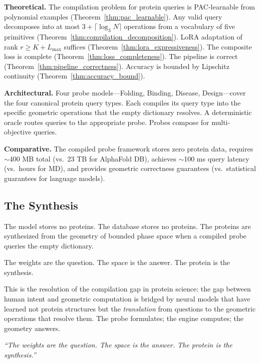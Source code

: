 \documentclass[11pt,twocolumn,a4paper]{article}
\theoremstyle{definition}
\theoremstyle{remark}
\begin{document}
\textbf{Theoretical.} The compilation problem for protein queries is PAC-learnable from polynomial examples (Theorem~\ref{thm:pac_learnable}). Any valid query decomposes into at most $3 + \lceil \log_3 N \rceil$ operations from a vocabulary of five primitives (Theorem~\ref{thm:compilation_decomposition}). LoRA adaptation of rank $r \geq K + L_{\max}$ suffices (Theorem~\ref{thm:lora_expressiveness}). The composite loss is complete (Theorem~\ref{thm:loss_completeness}). The pipeline is correct (Theorem~\ref{thm:pipeline_correctness}). Accuracy is bounded by Lipschitz continuity (Theorem~\ref{thm:accuracy_bound}).

\textbf{Architectural.} Four probe models---Folding, Binding, Disease, Design---cover the four canonical protein query types. Each compiles its query type into the specific geometric operations that the empty dictionary resolves. A deterministic oracle routes queries to the appropriate probe. Probes compose for multi-objective queries.

\textbf{Comparative.} The compiled probe framework stores zero protein data, requires $\sim$400 MB total (vs.\ 23 TB for AlphaFold DB), achieves $\sim$100 ms query latency (vs.\ hours for MD), and provides geometric correctness guarantees (vs.\ statistical guarantees for language models).

\subsection{The Synthesis}

The model stores no proteins. The database stores no proteins. The proteins are synthesized from the geometry of bounded phase space when a compiled probe queries the empty dictionary.

The weights are the question. The space is the answer. The protein is the synthesis.

This is the resolution of the compilation gap in protein science: the gap between human intent and geometric computation is bridged by neural models that have learned not protein structures but the \emph{translation} from questions to the geometric operations that resolve them. The probe formulates; the engine computes; the geometry answers.

\vspace{1em}
\noindent\textit{``The weights are the question. The space is the answer. The protein is the synthesis.''}



\end{document}
